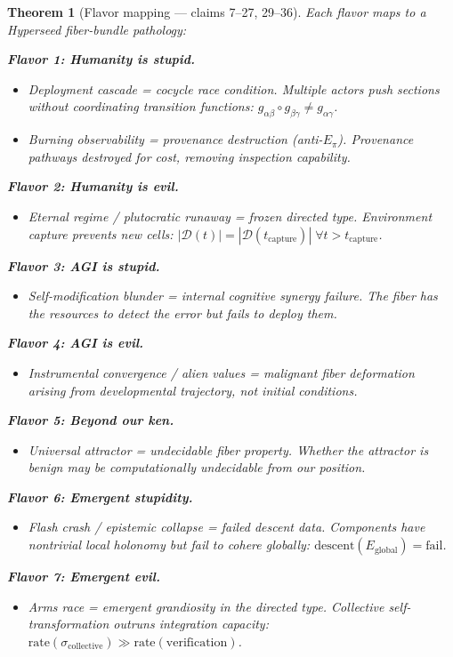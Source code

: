 \documentclass[11pt,a4paper]{article}
\newtheorem{theorem}[definition]{Theorem}
\begin{document}
\begin{theorem}[Flavor mapping --- claims 7--27, 29--36]
\label{thm:flavors}
Each flavor maps to a Hyperseed fiber-bundle pathology:

\textbf{Flavor 1: Humanity is stupid.}
\begin{itemize}
  \item Deployment cascade = cocycle race condition. Multiple actors push
    sections without coordinating transition functions:
    $g_{\alpha\beta} \circ g_{\beta\gamma} \neq g_{\alpha\gamma}$.
  \item Burning observability = provenance destruction (anti-$E_\pi$).
    Provenance pathways destroyed for cost, removing inspection capability.
\end{itemize}

\textbf{Flavor 2: Humanity is evil.}
\begin{itemize}
  \item Eternal regime / plutocratic runaway = frozen directed type.
    Environment capture prevents new cells:
    $|\mathcal{D}(t)| = |\mathcal{D}(t_{\text{capture}})| \;\forall t > t_{\text{capture}}$.
\end{itemize}

\textbf{Flavor 3: AGI is stupid.}
\begin{itemize}
  \item Self-modification blunder = internal cognitive synergy failure.
    The fiber has the resources to detect the error but fails to deploy them.
\end{itemize}

\textbf{Flavor 4: AGI is evil.}
\begin{itemize}
  \item Instrumental convergence / alien values = malignant fiber
    deformation arising from developmental trajectory, not initial conditions.
\end{itemize}

\textbf{Flavor 5: Beyond our ken.}
\begin{itemize}
  \item Universal attractor = undecidable fiber property. Whether the
    attractor is benign may be computationally undecidable from our position.
\end{itemize}

\textbf{Flavor 6: Emergent stupidity.}
\begin{itemize}
  \item Flash crash / epistemic collapse = failed descent data. Components
    have nontrivial local holonomy but fail to cohere globally:
    $\text{descent}(E_{\text{global}}) = \text{fail}$.
\end{itemize}

\textbf{Flavor 7: Emergent evil.}
\begin{itemize}
  \item Arms race = emergent grandiosity in the directed type. Collective
    self-transformation outruns integration capacity:
    $\text{rate}(\sigma_{\text{collective}}) \gg \text{rate}(\text{verification})$.
\end{itemize}
\end{theorem}
\end{document}
